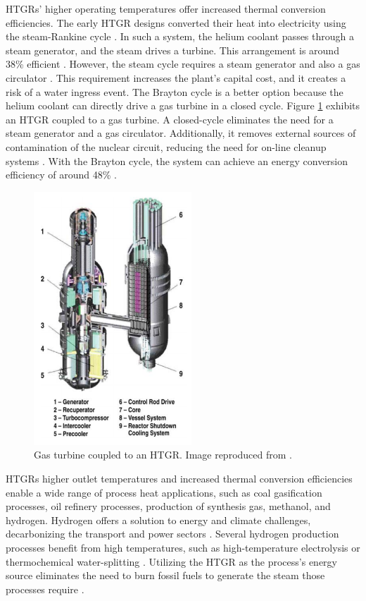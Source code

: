 HTGRs' higher operating temperatures offer increased thermal conversion efficiencies.
The early \gls{HTGR} designs converted their heat into electricity using the steam-Rankine cycle \cite{herranz_power_2009}.
In such a system, the helium coolant passes through a steam generator, and the steam drives a turbine.
This arrangement is around 38\% efficient \cite{breeze_nuclear_2014}.
However, the steam cycle requires a steam generator and also a gas circulator \cite{no_review_2007}.
This requirement increases the plant's capital cost, and it creates a risk of a water ingress event.
The Brayton cycle is a better option because the helium coolant can directly drive a gas turbine in a closed cycle.
Figure \ref{fig:gt-mhr} exhibits an HTGR coupled to a gas turbine.
A closed-cycle eliminates the need for a steam generator and a gas circulator.
Additionally, it removes external sources of contamination of the nuclear circuit, reducing the need for on-line cleanup systems \cite{iaea_current_2001}.
With the Brayton cycle, the system can achieve an energy conversion efficiency of around 48\% \cite{breeze_nuclear_2014}.

\begin{figure}[htbp!]
	\centering
	\includegraphics[height=9.5cm]{figures/gt-mhr3}
	\caption{Gas turbine coupled to an HTGR. Image reproduced from \cite{baxi_evaluation_2008}.}
	\label{fig:gt-mhr}
\end{figure}

HTGRs higher outlet temperatures and increased thermal conversion efficiencies enable a wide range of process heat applications, such as coal gasification processes, oil refinery processes, production of synthesis gas, methanol, and hydrogen.
Hydrogen offers a solution to energy and climate challenges, decarbonizing the transport and power sectors \cite{nagashima_japans_2018}.
Several hydrogen production processes benefit from high temperatures, such as high-temperature electrolysis \cite{doenitz_hydrogen_1980} or thermochemical water-splitting \cite{yildiz_efficiency_2006}.
Utilizing the \gls{HTGR} as the process's energy source eliminates the need to burn fossil fuels to generate the steam those processes require \cite{iaea_current_2001}.

